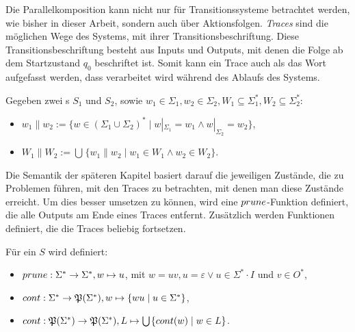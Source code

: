 Die Parallelkomposition kann nicht nur für Transitionssysteme betrachtet
werden, wie bisher in dieser Arbeit, sondern auch über Aktionsfolgen.
\emph{Traces} sind die möglichen Wege des Systems, mit ihrer
Transitionsbeschriftung. Diese Transitionsbeschriftung besteht aus Inputs und
Outputs, mit denen die Folge ab dem Startzustand $q_0$ beschriftet ist. Somit
kann ein Trace auch als das Wort aufgefasst werden, dass verarbeitet wird
während des Ablaufs des Systems.

\begin{Def}
  Gegeben zwei \EIO{}s $S_1$ und $S_2$, sowie $w_1\in\Sigma _1, w_2\in\Sigma
  _2, W_1\subseteq\Sigma _1^*, W_2\subseteq\Sigma _2^*$:
  \begin{itemize}
    \item $w_1\| w_2:=\{w\in (\Sigma _1\cup\Sigma _2)^*\mid w|_{\Sigma _1}=w_1\wedge
      w|_{\Sigma _2}=w_2\}$,
    \item $W_1\| W_2:=\bigcup\hspace{1pt}\{w_1\| w_2\mid w_1\in W_1\wedge w_2\in W_2\}$.
  \end{itemize}
\end{Def}

Die Semantik der späteren Kapitel basiert darauf die jeweiligen Zustände, die
zu Problemen führen, mit den Traces zu betrachten, mit denen man diese
Zustände erreicht. Um dies besser umsetzen zu können, wird eine
$prune{}$-Funktion definiert, die alle Outputs am Ende eines Traces entfernt.
Zusätzlich werden Funktionen definiert, die die Traces beliebig fortsetzen.

\begin{Def}
  Für ein \EIO{} $S$ wird definiert:
  \begin{itemize}
    \item $prune{}:\Sigma ^*\rightarrow\Sigma ^*, w\mapsto u$, mit $w=uv,
      u=\varepsilon\vee u\in\Sigma ^*\cdot I$ und $v\in O^*$,
    \item $cont{}:\Sigma ^*\rightarrow\mathfrak{P}(\Sigma ^*),
      w\mapsto\{wu\mid u\in\Sigma ^*\}$,
    \item $cont{}:\mathfrak{P}(\Sigma ^*)\rightarrow\mathfrak{P}(\Sigma ^*),
      L\mapsto\bigcup\hspace{1pt}\{cont{}(w)\mid w\in L\}$.
  \end{itemize}
\end{Def}

